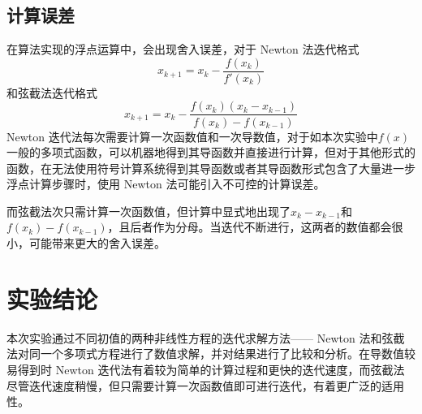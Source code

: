 \documentclass[11pt]{article}
\begin{document}
\subsection{计算误差}
在算法实现的浮点运算中，会出现舍入误差，对于 Newton 法迭代格式
\begin{equation}
    x_{k + 1} = x_k - \frac{f(x_k)}{f'(x_k)} \tag{6}
\end{equation}
和弦截法迭代格式
\begin{equation*}
    x_{k + 1} = x_k - \frac{f(x_k)(x_k - x_{k - 1})}{f(x_k) - f(x_{k - 1})} \tag{1}
\end{equation*}
Newton 迭代法每次需要计算一次函数值和一次导数值，对于如本次实验中$f(x)$一般的多项式函数，可以机器地得到其导函数并直接进行计算，但对于其他形式的函数，在无法使用符号计算系统得到其导函数或者其导函数形式包含了大量进一步浮点计算步骤时，使用 Newton 法可能引入不可控的计算误差。

而弦截法次只需计算一次函数值，但计算中显式地出现了$x_k - x_{k - 1}$和$f(x_k) - f(x_{k - 1})$，且后者作为分母。当迭代不断进行，这两者的数值都会很小，可能带来更大的舍入误差。

\section{实验结论}
本次实验通过不同初值的两种非线性方程的迭代求解方法—— Newton 法和弦截法对同一个多项式方程进行了数值求解，并对结果进行了比较和分析。在导数值较易得到时 Newton 迭代法有着较为简单的计算过程和更快的迭代速度，而弦截法尽管迭代速度稍慢，但只需要计算一次函数值即可进行迭代，有着更广泛的适用性。



\end{document}
